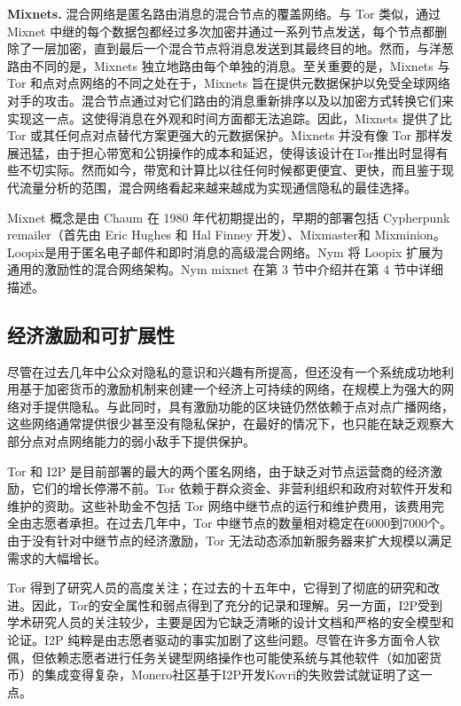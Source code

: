 \documentclass{article}
\begin{document}
	\textbf{Mixnets.} 混合网络是匿名路由消息的混合节点的覆盖网络。与 Tor 类似，通过 Mixnet 中继的每个数据包都经过多次加密\cite{ref29}并通过一系列节点发送，每个节点都删除了一层加密，直到最后一个混合节点将消息发送到其最终目的地。然而，与洋葱路由不同的是，Mixnets 独立地路由每个单独的消息。至关重要的是，Mixnets 与 Tor 和点对点网络的不同之处在于，Mixnets 旨在提供元数据保护以免受全球网络对手的攻击。混合节点通过对它们路由的消息重新排序以及以加密方式转换它们来实现这一点。这使得消息在外观和时间方面都无法追踪。因此，Mixnets 提供了比 Tor 或其任何点对点替代方案更强大的元数据保护。Mixnets 并没有像 Tor 那样发展迅猛，由于担心带宽和公钥操作的成本和延迟，使得该设计在Tor推出时显得有些不切实际。然而如今，带宽和计算比以往任何时候都更便宜、更快，而且鉴于现代流量分析的范围，混合网络看起来越来越成为实现通信隐私的最佳选择。\newline

	Mixnet 概念是由 Chaum 在 1980 年代初期提出的\cite{ref16}，早期的部署包括 Cypherpunk remailer（首先由 Eric Hughes 和 Hal Finney 开发）、Mixmaster\cite{ref23}和 Mixminion\cite{ref28}。Loopix\cite{ref89}是用于匿名电子邮件和即时消息的高级混合网络。Nym 将 Loopix 扩展为通用的激励性的混合网络架构。Nym mixnet 在第 3 节中介绍并在第 4 节中详细描述。\newline
	
	\subsection{经济激励和可扩展性}
	
	尽管在过去几年中公众对隐私的意识和兴趣有所提高，但还没有一个系统成功地利用基于加密货币的激励机制来创建一个经济上可持续的网络，在规模上为强大的网络对手提供隐私。与此同时，具有激励功能的区块链仍然依赖于点对点广播网络，这些网络通常提供很少甚至没有隐私保护，在最好的情况下，也只能在缺乏观察大部分点对点网络能力的弱小敌手下提供保护。\newline

	Tor 和 I2P 是目前部署的最大的两个匿名网络，由于缺乏对节点运营商的经济激励，它们的增长停滞不前。Tor 依赖于群众资金、非营利组织和政府对软件开发和维护的资助。这些补助金不包括 Tor 网络中继节点的运行和维护费用，该费用完全由志愿者承担。在过去几年中，Tor 中继节点的数量相对稳定在6000到7000个。由于没有针对中继节点的经济激励，Tor 无法动态添加新服务器来扩大规模以满足需求的大幅增长。\newline

	Tor 得到了研究人员的高度关注；在过去的十五年中，它得到了彻底的研究和改进。因此，Tor的安全属性和弱点得到了充分的记录和理解。另一方面，I2P受到学术研究人员的关注较少，主要是因为它缺乏清晰的设计文档和严格的安全模型和论证。I2P 纯粹是由志愿者驱动的事实加剧了这些问题。尽管在许多方面令人钦佩，但依赖志愿者进行任务关键型网络操作也可能使系统与其他软件（如加密货币）的集成变得复杂，Monero社区基于I2P开发Kovri的失败尝试就证明了这一点\cite{ref69}。\newline
\end{document}
